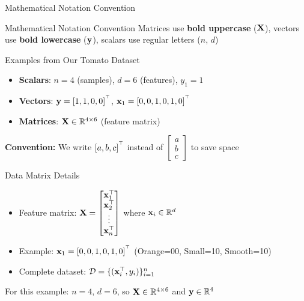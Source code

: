 \documentclass[usenames,dvipsnames]{beamer}
\begin{document}
\begin{frame}{Mathematical Notation Convention}
\begin{alertbox}{Mathematical Notation Convention}
Matrices use \textbf{bold uppercase} ($\mathbf{X}$), vectors use \textbf{bold lowercase} ($\mathbf{y}$), scalars use regular letters ($n$, $d$)
\end{alertbox}

\begin{examplebox}{Examples from Our Tomato Dataset}
\begin{itemize}
	\item \textbf{Scalars}: $n = 4$ (samples), $d = 6$ (features), $y_1 = 1$ 
	\item \pause \textbf{Vectors}: $\mathbf{y} = [1, 1, 0, 0]^{^\top}$, $\mathbf{x}_1 = [0, 0, 1, 0, 1, 0]^{^\top}$ 
	\item \pause \textbf{Matrices}: $\mathbf{X} \in \mathbb{R}^{4 \times 6}$ (feature matrix)
\end{itemize}
\end{examplebox}

\pause \textbf{Convention:} We write $[a, b, c]^{^\top}$ instead of $\begin{bmatrix} a \\ b \\ c \end{bmatrix}$ to save space
\end{frame}

\begin{frame}{Data Matrix Details}
\begin{itemize}
	\item Feature matrix: $\mathbf{X} = \begin{bmatrix} \mathbf{x}_1^\top \\ \mathbf{x}_2^\top \\ \vdots \\ \mathbf{x}_n^\top \end{bmatrix}$ where $\mathbf{x}_i \in \mathbb{R}^d$
	\item \pause Example: $\mathbf{x}_1 = [0, 0, 1, 0, 1, 0]^{^\top}$ (Orange=00, Small=10, Smooth=10)
	\item \pause Complete dataset: $\mathcal{D} = \{(\mathbf{x}_i^\top, y_i)\}_{i=1}^n$
\end{itemize}

\pause For this example: $n = 4$, $d = 6$, so $\mathbf{X} \in \mathbb{R}^{4 \times 6}$ and $\mathbf{y} \in \mathbb{R}^4$
\end{frame}
\end{document}
